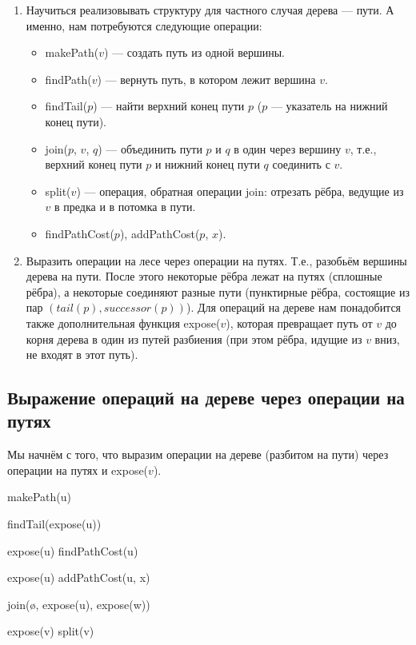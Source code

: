 \begin{enumerate}
    \item Научиться реализовывать структуру для частного случая дерева --- пути. А именно, нам потребуются следующие операции:
        \begin{itemize}
            \item makePath($v$) --- создать путь из одной вершины.
            \item findPath($v$) --- вернуть путь, в котором лежит вершина $v$.
            \item findTail($p$) --- найти верхний конец пути $p$ ($p$ --- указатель на нижний конец пути). 
            \item join($p$, $v$, $q$) --- объединить пути $p$ и $q$ в один через вершину $v$, т.е., верхний конец пути $p$ и нижний конец пути $q$ соединить с $v$.
            \item split($v$) --- операция, обратная операции join: отрезать рёбра, ведущие из $v$ в предка и в потомка в пути.
            \item findPathCost($p$), addPathCost($p$, $x$).
        \end{itemize}
    \item Выразить операции на лесе через операции на путях. Т.е., разобьём вершины дерева на пути. После этого некоторые рёбра лежат на путях (сплошные рёбра), а некоторые соединяют разные пути (пунктирные рёбра, состоящие из пар $(tail(p), successor(p))$). Для операций на дереве нам понадобится также дополнительная функция expose($v$), которая превращает путь от $v$ до корня дерева в один из путей разбиения (при этом рёбра, идущие из $v$ вниз, не входят в этот путь).
\end{enumerate}

\subsection{Выражение операций на дереве через операции на путях}

Мы начнём с того, что выразим операции на дереве (разбитом на пути) через операции на путях и expose($v$).

\begin{algorithmic}[1]
		\State makePath(u)
	\EndProcedure

		\State findTail(expose(u))
	\EndProcedure

		\State expose(u)
		\State findPathCost(u)
	\EndProcedure

		\State expose(u)
		\State addPathCost(u, x)
	\EndProcedure

		\State join(\o, expose(u), expose(w))
	\EndProcedure

		\State expose(v)
		\State split(v)
	\EndProcedure

\end{algorithmic}

